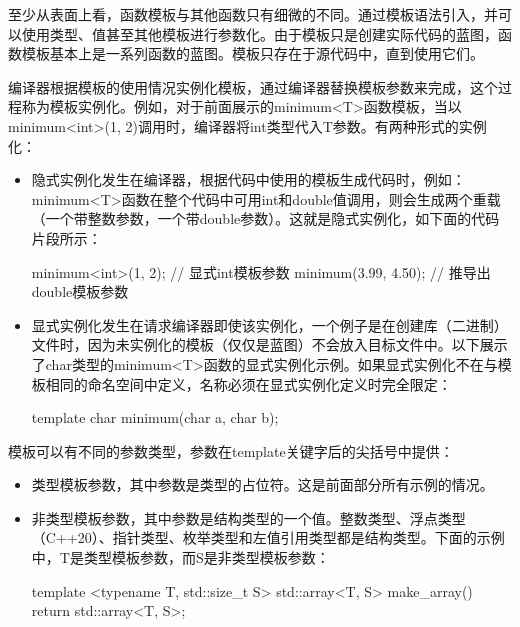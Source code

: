 
至少从表面上看，函数模板与其他函数只有细微的不同。通过模板语法引入，并可以使用类型、值甚至其他模板进行参数化。由于模板只是创建实际代码的蓝图，函数模板基本上是一系列函数的蓝图。模板只存在于源代码中，直到使用它们。

编译器根据模板的使用情况实例化模板，通过编译器替换模板参数来完成，这个过程称为模板实例化。例如，对于前面展示的minimum<T>函数模板，当以minimum<int>(1, 2)调用时，编译器将int类型代入T参数。有两种形式的实例化：

\begin{itemize}
\item
隐式实例化发生在编译器，根据代码中使用的模板生成代码时，例如：minimum<T>函数在整个代码中可用int和double值调用，则会生成两个重载（一个带整数参数，一个带double参数）。这就是隐式实例化，如下面的代码片段所示：

\begin{cpp}
minimum<int>(1, 2);  // 显式int模板参数
minimum(3.99, 4.50); // 推导出double模板参数
\end{cpp}

\item
显式实例化发生在请求编译器即使该实例化，一个例子是在创建库（二进制）文件时，因为未实例化的模板（仅仅是蓝图）不会放入目标文件中。以下展示了char类型的minimum<T>函数的显式实例化示例。如果显式实例化不在与模板相同的命名空间中定义，名称必须在显式实例化定义时完全限定：

\begin{cpp}
template char minimum(char a, char b);
\end{cpp}

\end{itemize}

模板可以有不同的参数类型，参数在template关键字后的尖括号中提供：

\begin{itemize}
\item
类型模板参数，其中参数是类型的占位符。这是前面部分所有示例的情况。

\item
非类型模板参数，其中参数是结构类型的一个值。整数类型、浮点类型（C++20）、指针类型、枚举类型和左值引用类型都是结构类型。下面的示例中，T是类型模板参数，而S是非类型模板参数：

\begin{cpp}
template <typename T, std::size_t S>
std::array<T, S> make_array()
{
    return std::array<T, S>{};
}
\end{cpp}
\end{itemize}

